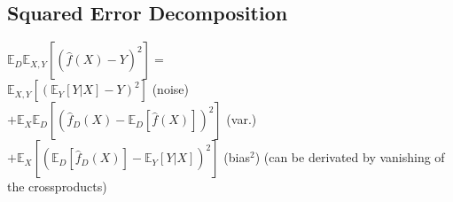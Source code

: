 \subsection*{Squared Error Decomposition}
$\mathbb{E}_D\mathbb{E}_{X,Y}[(\hat{f}(X)-Y)^2]=$\\
$\mathbb{E}_{X,Y}[(\mathbb{E}_Y[Y|X]-Y)^2]$ (noise)\\
$+\mathbb{E}_X\mathbb{E}_D[(\hat{f}_D(X)-\mathbb{E}_D[\hat{f}(X)])^2]$ (var.)\\
$+\mathbb{E}_X[(\mathbb{E}_D[\hat{f}_D(X)]-\mathbb{E}_Y[Y|X])^2]$ (bias$^2$)
(can be derivated by vanishing of the crossproducts)